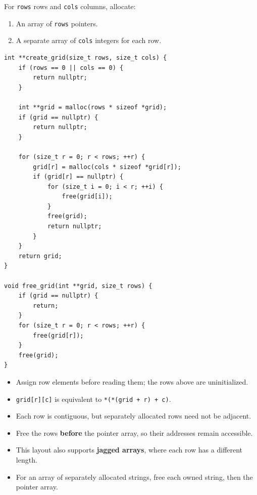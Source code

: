 \documentclass[11pt,a4paper]{article}
\providecommand{\tightlist}{\setlength{\itemsep}{0pt}\setlength{\parskip}{0pt}}
\begin{document}
\label{dynamically-allocated-grids-and-structs}
\hypertarget{dynamically-allocated-grids-and-structs}{}

\label{an-array-of-row-pointers}
\hypertarget{an-array-of-row-pointers}{}

For \texttt{rows} rows and \texttt{cols} columns, allocate:

\begin{enumerate}
\def\labelenumi{\arabic{enumi}.}
\tightlist
\item
  An array of \texttt{rows} pointers.
\item
  A separate array of \texttt{cols} integers for each row.
\end{enumerate}

\begin{lstlisting}[style=cscode]
int **create_grid(size_t rows, size_t cols) {
    if (rows == 0 || cols == 0) {
        return nullptr;
    }

    int **grid = malloc(rows * sizeof *grid);
    if (grid == nullptr) {
        return nullptr;
    }

    for (size_t r = 0; r < rows; ++r) {
        grid[r] = malloc(cols * sizeof *grid[r]);
        if (grid[r] == nullptr) {
            for (size_t i = 0; i < r; ++i) {
                free(grid[i]);
            }
            free(grid);
            return nullptr;
        }
    }
    return grid;
}

void free_grid(int **grid, size_t rows) {
    if (grid == nullptr) {
        return;
    }
    for (size_t r = 0; r < rows; ++r) {
        free(grid[r]);
    }
    free(grid);
}
\end{lstlisting}

\begin{itemize}
\tightlist
\item
  Assign row elements before reading them; the rows above are uninitialized.
\item
  \texttt{grid{[}r{]}{[}c{]}} is equivalent to \texttt{*(*(grid\ +\ r)\ +\ c)}.
\item
  Each row is contiguous, but separately allocated rows need not be adjacent.
\item
  Free the rows \textbf{before} the pointer array, so their addresses remain accessible.
\item
  This layout also supports \textbf{jagged arrays}, where each row has a different length.
\item
  For an array of separately allocated strings, free each owned string, then the pointer array.
\end{itemize}
\end{document}
